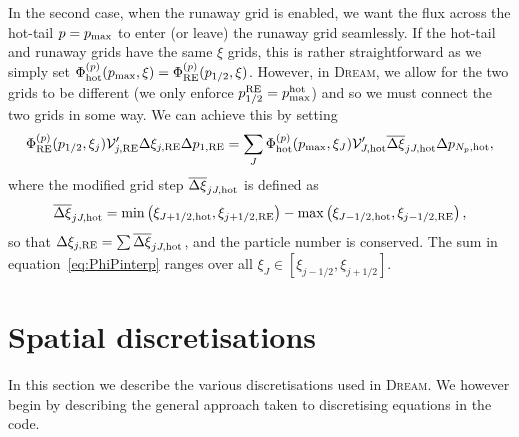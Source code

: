 \documentclass{notes}
\newcommand{\DREAM}{\textsc{Dream}}
\newcommand{\Vp}{\mathcal{V}'}
\begin{document}
    In the second case, when the runaway grid is enabled, we want the flux
    across the hot-tail $p=p_{\rm max}$ to enter (or leave) the runaway grid
    seamlessly. If the hot-tail and runaway grids have the same $\xi$ grids,
    this is rather straightforward as we simply set 
    $\Phi^{(p)}_{\rm hot}(p_{\rm max},\xi) = \Phi^{(p)}_{\rm RE}(p_{1/2},\xi)$.
    However, in \DREAM, we allow for the two grids to be different (we only
    enforce $p^{\rm RE}_{1/2} = p^{\rm hot}_{\rm max}$) and so we must connect
    the two grids in some way. We can achieve this by setting
    \begin{equation}\label{eq:fluxCross}
        \Phi^{(p)}_{\rm RE}(p_{1/2},\xi_j)\Vp_{j,\rm RE}\Delta\xi_{j,\rm RE}\Delta p_{1,{\rm RE}} =
        \sum_{J} \Phi^{(p)}_{\rm hot}(p_{\rm max},\xi_J) \Vp_{J,\rm hot} \overline{\Delta\xi}_{jJ,\rm hot}
        \Delta p_{N_p,{\rm hot}},
    \end{equation}
    where the modified grid step $\overline{\Delta\xi}_{jJ,\rm hot}$ is defined
    as
    \begin{equation}\label{eq:PhiPinterp}
        \overline{\Delta\xi}_{jJ,\rm hot} = \min\left(\xi_{J+1/2,{\rm hot}},\xi_{j+1/2,{\rm RE}}\right) -
        \max\left( \xi_{J-1/2,{\rm hot}}, \xi_{j-1/2,{\rm RE}} \right),
    \end{equation}
    so that $\Delta\xi_{j,\rm RE} = \sum\overline{\Delta\xi}_{jJ,\rm hot}$, and
    the particle number is conserved. The sum in equation~\eqref{eq:PhiPinterp}
    ranges over all $\xi_J\in [\xi_{j-1/2},\xi_{j+1/2}]$.

    \section{Spatial discretisations}
    In this section we describe the various discretisations used in \DREAM. We
    however begin by describing the general approach taken to discretising
    equations in the code.
\end{document}
